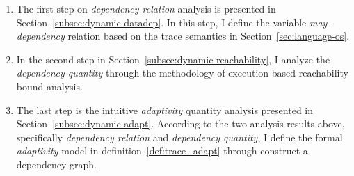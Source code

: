  \begin{enumerate}
 \item The first step on \emph{dependency relation} analysis is presented in 
 Section~\ref{subsec:dynamic-datadep}.
 In this step, I define the variable \emph{may-dependency} relation based on the trace semantics in Section~\ref{sec:language-os}.
 \item In the second step in Section~\ref{subsec:dynamic-reachability}, I analyze the \emph{dependency quantity} through the methodology of execution-based reachability bound analysis.
 \item The last step is the intuitive \emph{adaptivity} quantity analysis presented in Section~\ref{subsec:dynamic-adapt}.
 According to the two analysis results above, specifically \emph{dependency relation} and \emph{dependency quantity},
 I define the formal \emph{adaptivity} model in definition~\ref{def:trace_adapt} through 
 construct a dependency graph.
 \end{enumerate}